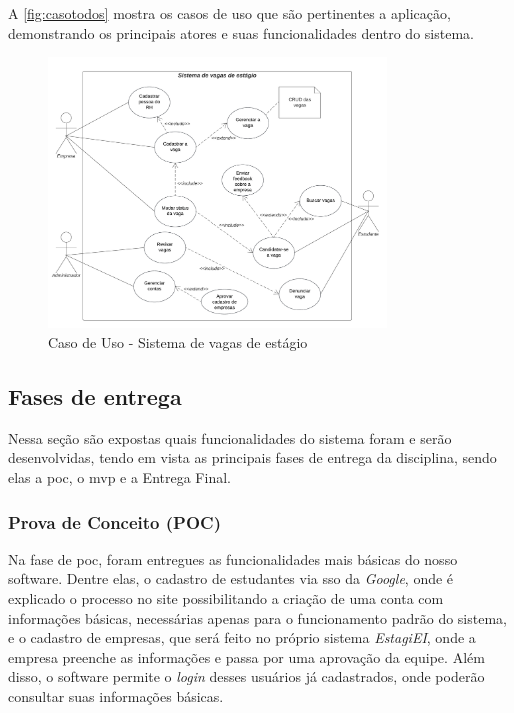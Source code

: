 A \autoref{fig:casotodos} mostra os casos de uso que são pertinentes a aplicação, demonstrando os principais atores e suas funcionalidades dentro do sistema.

\begin{figure}[H]
	\centering 
	\caption{\label{fig:casotodos}Caso de Uso - Sistema de vagas de estágio}
	\includegraphics[width=0.8\textwidth]{../imagens/caso-de-uso-todos.png} 
\end{figure}

\subsection{Fases de entrega}

Nessa seção são expostas quais funcionalidades do sistema foram e serão desenvolvidas, tendo em vista as principais fases de entrega da disciplina, sendo elas a \ac{poc}, o \ac{mvp} e a Entrega Final.

\subsubsection{Prova de Conceito (POC)} \label{entrega-poc}

Na fase de \ac{poc}, foram entregues as funcionalidades mais básicas do nosso software. Dentre elas, o cadastro de estudantes via \ac{sso} da \textit{Google}, onde é explicado o processo no site possibilitando a criação de uma conta com informações básicas, necessárias apenas para o funcionamento padrão do sistema, e o cadastro de empresas, que será feito no próprio sistema \emph{EstagiEI}, onde a empresa preenche as informações e passa por uma aprovação da equipe. Além disso, o software permite o \textit{login} desses usuários já cadastrados, onde poderão consultar suas informações básicas.

